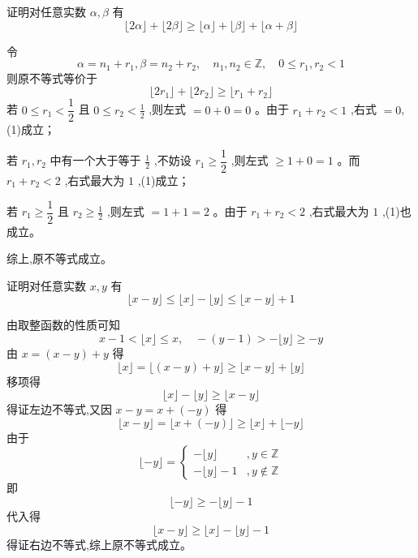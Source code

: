 \begin{questions}
    \question 证明对任意实数 $\alpha, \beta$ 有 
    \[
    \lfloor 2\alpha \rfloor + \lfloor 2\beta \rfloor \ge \lfloor \alpha \rfloor + \lfloor \beta \rfloor + \lfloor \alpha + \beta \rfloor
    \]
    \begin{solution}
        令 
        \[
        \alpha = n_1 + r_1,\beta = n_2 + r_2, \quad n_1, n_2 \in \mathbb{Z},\quad 0 \le r_1, r_2 < 1
        \]
        则原不等式等价于
        \[ 
        \lfloor 2r_1 \rfloor + \lfloor 2r_2 \rfloor \ge \lfloor r_1 + r_2 \rfloor \tag{1}
        \]
        若 $0 \le r_1 < \dfrac{1}{2}$ 且 $0 \le r_2 < \frac{1}{2}$ ,则左式 $= 0 + 0 = 0$ 。由于 $r_1 + r_2 < 1$ ,右式 $= 0$,(1)成立；

        若 $r_1, r_2$ 中有一个大于等于 $\frac{1}{2}$ ,不妨设 $r_1 \ge \dfrac{1}{2}$ ,则左式 $\ge 1 + 0 = 1$ 。而 $r_1 + r_2 < 2$ ,右式最大为 $1$ ,(1)成立；

        若 $r_1 \ge \dfrac{1}{2}$ 且 $r_2 \ge \frac{1}{2}$ ,则左式 $= 1 + 1 = 2$ 。由于 $r_1 + r_2 < 2$ ,右式最大为 $1$ ,(1)也成立。

        综上,原不等式成立。
    \end{solution}

    \question 证明对任意实数 $x, y$ 有 
    \[
    \lfloor x - y \rfloor \le \lfloor x \rfloor - \lfloor y \rfloor \le \lfloor x - y \rfloor + 1
    \]
    \begin{solution}
        由取整函数的性质可知 
        \[
        x - 1 < \lfloor x \rfloor \le x,\quad -(y - 1) > -\lfloor y \rfloor \ge -y
        \]
        由 $x = (x - y) + y$ 得 
        \[
        \lfloor x \rfloor = \lfloor (x - y) + y \rfloor \ge \lfloor x - y \rfloor + \lfloor y \rfloor
        \]
        移项得 
        \[
        \lfloor x \rfloor - \lfloor y \rfloor \ge \lfloor x - y \rfloor
        \]
        得证左边不等式,又因 $x - y = x + (-y)$ 得 
        \[
        \lfloor x - y \rfloor = \lfloor x + (-y) \rfloor \ge \lfloor x \rfloor + \lfloor -y \rfloor
        \]
        由于 
        \[
        \lfloor -y \rfloor = 
        \begin{cases}
        -\lfloor y \rfloor &,y \in \mathbb{Z} \\ 
        -\lfloor y \rfloor - 1 &,y \not\in \mathbb{Z}
        \end{cases}
        \]
        即 
        \[
        \lfloor -y \rfloor \ge -\lfloor y \rfloor - 1
        \]
        代入得 
        \[
        \lfloor x - y \rfloor \ge \lfloor x \rfloor - \lfloor y \rfloor - 1
        \]
        得证右边不等式,综上原不等式成立。
    \end{solution}


\end{questions}
